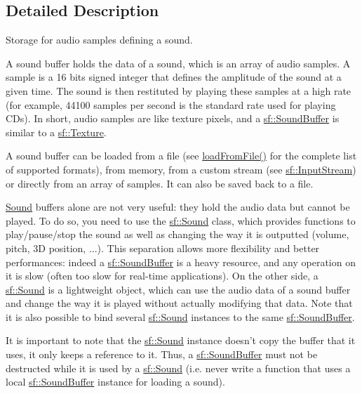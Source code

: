 \subsection{Detailed Description}
Storage for audio samples defining a sound. 

A sound buffer holds the data of a sound, which is an array of audio samples. A sample is a 16 bits signed integer that defines the amplitude of the sound at a given time. The sound is then restituted by playing these samples at a high rate (for example, 44100 samples per second is the standard rate used for playing C\+Ds). In short, audio samples are like texture pixels, and a \hyperlink{classsf_1_1_sound_buffer}{sf\+::\+Sound\+Buffer} is similar to a \hyperlink{classsf_1_1_texture}{sf\+::\+Texture}.

A sound buffer can be loaded from a file (see \hyperlink{classsf_1_1_sound_buffer_a2be6a8025c97eb622a7dff6cf2594394}{load\+From\+File()} for the complete list of supported formats), from memory, from a custom stream (see \hyperlink{classsf_1_1_input_stream}{sf\+::\+Input\+Stream}) or directly from an array of samples. It can also be saved back to a file.

\hyperlink{classsf_1_1_sound}{Sound} buffers alone are not very useful\+: they hold the audio data but cannot be played. To do so, you need to use the \hyperlink{classsf_1_1_sound}{sf\+::\+Sound} class, which provides functions to play/pause/stop the sound as well as changing the way it is outputted (volume, pitch, 3\+D position, ...). This separation allows more flexibility and better performances\+: indeed a \hyperlink{classsf_1_1_sound_buffer}{sf\+::\+Sound\+Buffer} is a heavy resource, and any operation on it is slow (often too slow for real-\/time applications). On the other side, a \hyperlink{classsf_1_1_sound}{sf\+::\+Sound} is a lightweight object, which can use the audio data of a sound buffer and change the way it is played without actually modifying that data. Note that it is also possible to bind several \hyperlink{classsf_1_1_sound}{sf\+::\+Sound} instances to the same \hyperlink{classsf_1_1_sound_buffer}{sf\+::\+Sound\+Buffer}.

It is important to note that the \hyperlink{classsf_1_1_sound}{sf\+::\+Sound} instance doesn't copy the buffer that it uses, it only keeps a reference to it. Thus, a \hyperlink{classsf_1_1_sound_buffer}{sf\+::\+Sound\+Buffer} must not be destructed while it is used by a \hyperlink{classsf_1_1_sound}{sf\+::\+Sound} (i.\+e. never write a function that uses a local \hyperlink{classsf_1_1_sound_buffer}{sf\+::\+Sound\+Buffer} instance for loading a sound).

